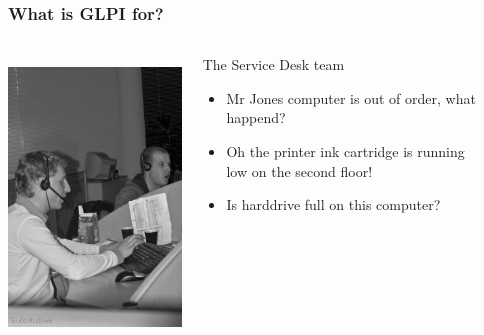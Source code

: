 \documentclass{beamer}
\begin{document}
\begin{frame}
    \frametitle{What is GLPI for?}

 \begin{columns}
 \begin{column}{0.1\textwidth}
         \includegraphics[height=7.5cm]{./pics/helpdesk.jpg}
 \end{column}
 \begin{column}{1\textwidth}

    \begin{block}{The Service Desk team}
        \begin{itemize}
            \item Mr Jones computer is out of order, what happend?
            \item Oh the printer ink cartridge is running \\
                low on the second floor!
            \item Is harddrive full on this computer?
        \end{itemize}
    \end{block}
 \end{column}
\end{columns}


\end{frame}
\end{document}
